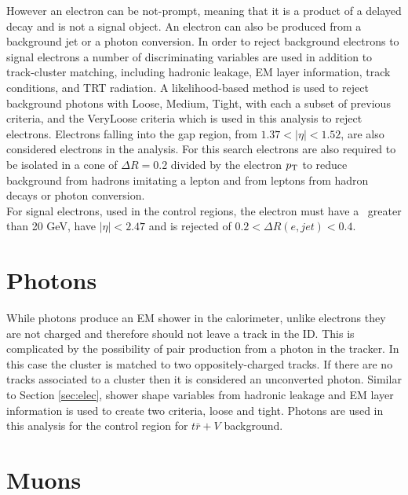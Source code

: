 However an electron can be not-prompt, meaning that it is a product of a delayed decay and is not a signal object. An electron can also be produced from a background jet or a photon conversion.  In order to reject background electrons to signal electrons a number of discriminating variables are used in addition to track-cluster matching, including hadronic leakage, EM layer information, track conditions, and TRT radiation. A likelihood-based method is used to reject background photons with Loose, Medium, Tight, with each a subset of previous criteria, and the VeryLoose criteria which is used in this analysis to reject electrons.  Electrons falling into the gap region, from $1.37 < |\eta| < 1.52$, are also considered electrons in the analysis.  For this search electrons are also required to be isolated in a cone of $\Delta R=$0.2 divided by the electron $p_{\mathrm{T}}$ to reduce background from hadrons imitating a lepton and from leptons from hadron decays or photon conversion.  \\

For signal electrons, used in the control regions, the electron must have a \pt\ greater than 20 GeV, have $|\eta |<2.47$ and is rejected of $0.2<\Delta R(e,jet)<0.4$.  \\



\section{Photons}

While photons produce an EM shower in the calorimeter, unlike electrons they are not charged and therefore should not leave a track in the ID.  This is complicated by the possibility of pair production from a photon in the tracker.  In this case the cluster is matched to two oppositely-charged tracks.  If there are no tracks associated to a cluster then it is considered an unconverted photon.  Similar to Section \ref{sec:elec}, shower shape variables from hadronic leakage and EM layer information is used\cite{ATL-PHYS-PUB-2016-014} to create two criteria, loose and tight.  Photons are used in this analysis for the control region for $t\bar{r}+V$ background.

\section{Muons}
\label{section:muons}

